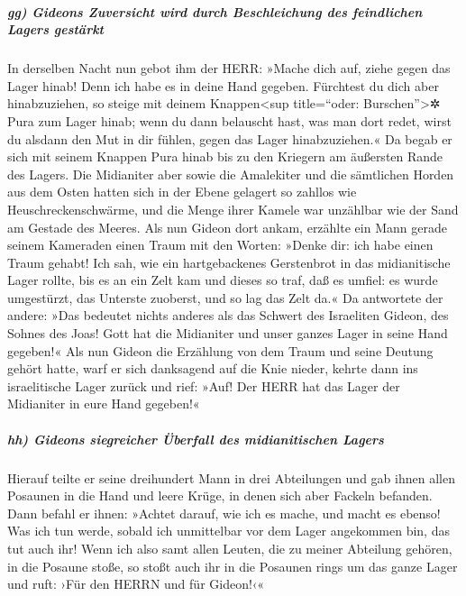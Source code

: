 \hypertarget{gg-gideons-zuversicht-wird-durch-beschleichung-des-feindlichen-lagers-gestuxe4rkt}{%
\subparagraph{gg) Gideons Zuversicht wird durch Beschleichung des
feindlichen Lagers
gestärkt}\label{gg-gideons-zuversicht-wird-durch-beschleichung-des-feindlichen-lagers-gestuxe4rkt}}

In derselben Nacht nun gebot ihm der HERR: »Mache dich
auf, ziehe gegen das Lager hinab! Denn ich habe es in deine Hand
gegeben. Fürchtest du dich aber hinabzuziehen, so steige
mit deinem Knappen\textless sup title=``oder: Burschen''\textgreater✲
Pura zum Lager hinab; wenn du dann belauscht hast, was
man dort redet, wirst du alsdann den Mut in dir fühlen, gegen das Lager
hinabzuziehen.« Da begab er sich mit seinem Knappen Pura hinab bis zu
den Kriegern am äußersten Rande des Lagers. Die
Midianiter aber sowie die Amalekiter und die sämtlichen Horden aus dem
Osten hatten sich in der Ebene gelagert so zahllos wie
Heuschreckenschwärme, und die Menge ihrer Kamele war unzählbar wie der
Sand am Gestade des Meeres. Als nun Gideon dort ankam,
erzählte ein Mann gerade seinem Kameraden einen Traum mit den Worten:
»Denke dir: ich habe einen Traum gehabt! Ich sah, wie ein hartgebackenes
Gerstenbrot in das midianitische Lager rollte, bis es an ein Zelt kam
und dieses so traf, daß es umfiel: es wurde umgestürzt, das Unterste
zuoberst, und so lag das Zelt da.« Da antwortete der
andere: »Das bedeutet nichts anderes als das Schwert des Israeliten
Gideon, des Sohnes des Joas! Gott hat die Midianiter und unser ganzes
Lager in seine Hand gegeben!« Als nun Gideon die
Erzählung von dem Traum und seine Deutung gehört hatte, warf er sich
danksagend auf die Knie nieder, kehrte dann ins israelitische Lager
zurück und rief: »Auf! Der HERR hat das Lager der Midianiter in eure
Hand gegeben!«

\hypertarget{hh-gideons-siegreicher-uxfcberfall-des-midianitischen-lagers}{%
\subparagraph{hh) Gideons siegreicher Überfall des midianitischen
Lagers}\label{hh-gideons-siegreicher-uxfcberfall-des-midianitischen-lagers}}

Hierauf teilte er seine dreihundert Mann in drei
Abteilungen und gab ihnen allen Posaunen in die Hand und leere Krüge, in
denen sich aber Fackeln befanden. Dann befahl er ihnen:
»Achtet darauf, wie ich es mache, und macht es ebenso! Was ich tun
werde, sobald ich unmittelbar vor dem Lager angekommen bin, das tut auch
ihr! Wenn ich also samt allen Leuten, die zu meiner
Abteilung gehören, in die Posaune stoße, so stoßt auch ihr in die
Posaunen rings um das ganze Lager und ruft: ›Für den HERRN und für
Gideon!‹«

